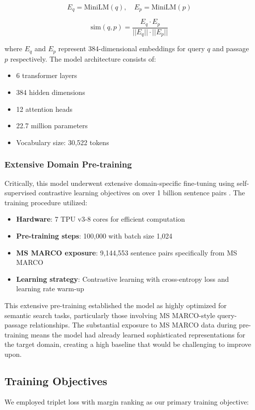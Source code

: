 \documentclass[conference]{IEEEtran}
\begin{document}
\begin{equation}
E_q = \text{MiniLM}(q), \quad E_p = \text{MiniLM}(p)
\end{equation}

\begin{equation}
\text{sim}(q,p) = \frac{E_q \cdot E_p}{||E_q|| \cdot ||E_p||}
\end{equation}

where $E_q$ and $E_p$ represent 384-dimensional embeddings for query $q$ and passage $p$ respectively. The model architecture consists of:
\begin{itemize}
\item 6 transformer layers
\item 384 hidden dimensions
\item 12 attention heads
\item 22.7 million parameters
\item Vocabulary size: 30,522 tokens
\end{itemize}

\subsubsection{Extensive Domain Pre-training}
Critically, this model underwent extensive domain-specific fine-tuning using self-supervised contrastive learning objectives on over 1 billion sentence pairs \cite{huggingface_minilm}. The training procedure utilized:
\begin{itemize}
\item \textbf{Hardware}: 7 TPU v3-8 cores for efficient computation
\item \textbf{Pre-training steps}: 100,000 with batch size 1,024
\item \textbf{MS MARCO exposure}: 9,144,553 sentence pairs specifically from MS MARCO
\item \textbf{Learning strategy}: Contrastive learning with cross-entropy loss and learning rate warm-up
\end{itemize}

This extensive pre-training established the model as highly optimized for semantic search tasks, particularly those involving MS MARCO-style query-passage relationships. The substantial exposure to MS MARCO data during pre-training means the model had already learned sophisticated representations for the target domain, creating a high baseline that would be challenging to improve upon.

\subsection{Training Objectives}
We employed triplet loss \cite{schroff2015facenet} with margin ranking as our primary training objective:
\end{document}
